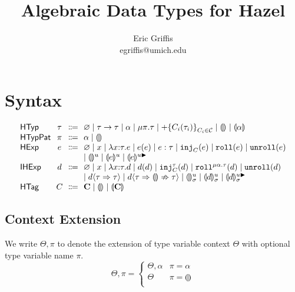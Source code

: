 \documentclass{article}
\title{Algebraic Data Types for Hazel}
\author{Eric Griffis \\ egriffis@umich.edu}
\date{}
\let\originalleft\left
\let\originalright\right
\renewcommand{\left}{\mathopen{}\mathclose\bgroup\originalleft}
\renewcommand{\right}{\aftergroup\egroup\originalright}
\newcommand\Sort[1]{\mathsf{#1}}
\newcommand\IHExp{\Sort{IHExp}}
\newcommand\HExp{\Sort{HExp}}
\newcommand\HTag{\Sort{HTag}}
\newcommand\HTyp{\Sort{HTyp}}
\newcommand\HTypPat{\Sort{HTypPat}}
\newcommand\hole[2][]{\llparenthesis#1\rrparenthesis^{#2}}
\newcommand\mhole[2][]{\llparenthesis#1\rrparenthesis^{#2 \blacktriangleright}}
\newcommand\dhole[3][]{\llparenthesis#1\rrparenthesis_{#2}^{#3}}
\newcommand\dmhole[3][]{\llparenthesis#1\rrparenthesis_{#2}^{#3 \blacktriangleright}}
\newcommand\Tarr[2]{#1 \rightarrow #2}
\newcommand\Trec[2]{\mu{#1}.{#2}}
\newcommand\Tsum[1]{+\mathopen{}\left\{#1\right\}}
\newcommand\Tag{\mathbf{C}}
\newcommand\TagSet{\mathcal{C}}
\newcommand\TagHole[2][]{\hole[#1]{#2}}
\newcommand\Unit{\varnothing}
\newcommand\literal[1]{\mathtt{#1}}
\newcommand\asc[2]{{#1}:{#2}}
\newcommand\Efun[3]{\lambda{#1}{:}{#2}.{#3}}
\newcommand\Eapp[2]{{#1}\left({#2}\right)}
\newcommand\Einj[2]{\literal{inj}_{#1}\left({#2}\right)}
\newcommand\Ecase[2]{\literal{case} \left({#1}\right) \left\{{#2}\right\}}
\newcommand\Eroll[1]{\literal{roll}\left(#1\right)}
\newcommand\Eunroll[1]{\literal{unroll}\left(#1\right)}
\newcommand\Dfun[3]{\lambda{#1}{:}{#2}.{#3}}
\newcommand\Dapp[2]{{#1}\left({#2}\right)}
\newcommand\Dinj[3]{\literal{inj}_{#1}^{#2}\left({#3}\right)}
\newcommand\Dcase[2]{\literal{case} \left({#1}\right) \left\{{#2}\right\}}
\newcommand\Droll[3]{\literal{roll}^{\Trec{#1}{#2}}\left({#3}\right)}
\newcommand\Dunroll[1]{\literal{unroll}\left(#1\right)}
\newcommand\cast[3]{{#1}\langle{#2}\Rightarrow{#3}\rangle}
\newcommand\failedcast[3]{{#1}\langle{#2}\Rightarrow{\llparenthesis\rrparenthesis}\nRightarrow{#3}\rangle}
\begin{document}
\maketitle


\section{Syntax}

\[
  \arraycolsep=0pt
  \begin{array}{l@{~~}c@{~~}c@{~~}l}
    \HTyp & \tau & \Coloneqq &
      \Unit
      \mid \Tarr{\tau}{\tau}
      \mid \alpha
      \mid \Trec{\pi}{\tau}
      \mid \Tsum{C_i(\tau_i)}_{C_i \in \TagSet}
      \mid \hole{}
      \mid \hole[\alpha]{}
      \\
    \HTypPat & \pi & \Coloneqq & \alpha \mid \hole{} \\
    \HExp & e & \Coloneqq &
      \Unit
      \mid x
      \mid \Efun{x}{\tau}{e}
      \mid \Eapp{e}{e}
      \mid \asc{e}{\tau}
      \mid \Einj{C}{e}
      \mid \Eroll{e}
      \mid \Eunroll{e}
      \\ & & &
      \mid \hole{u}
      \mid \hole[e]{u}
      \mid \mhole[e]{u}
      \\
    \IHExp & d & \Coloneqq &
      \Unit
      \mid x
      \mid \Dfun{x}{\tau}{d}
      \mid \Dapp{d}{d}
      \mid \Dinj{C}{\tau}{d}
      \mid \Droll{\alpha}{\tau}{d}
      \mid \Dunroll{d}
      \\ & & &
      \mid \cast{d}{\tau}{\tau}
      \mid \failedcast{d}{\tau}{\tau}
      \mid \dhole{\sigma}{u}
      \mid \dhole[d]{\sigma}{u}
      \mid \dmhole[d]{\sigma}{u}
      \\
    \HTag & C & \Coloneqq &
      \Tag
      \mid \TagHole{}
      \mid \TagHole[\Tag]{}
      \\
  \end{array}
\]


\subsection{Context Extension}

We write $\Theta, \pi$ to denote the extension of type variable context $\Theta$ with optional type variable name $\pi$.
\[
  \Theta, \pi = \begin{cases}
    \Theta, \alpha & \pi = \alpha \\
    \Theta & \pi = \hole{} \\
  \end{cases}
\]
\end{document}
